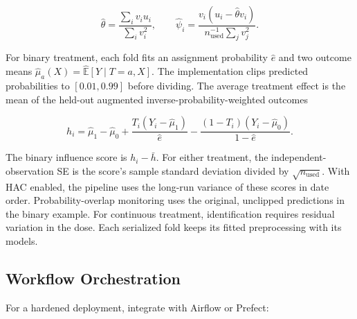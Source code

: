 \[
\hat\theta=\frac{\sum_i v_i u_i}{\sum_i v_i^2},
\qquad
\hat\psi_i=\frac{v_i(u_i-\hat\theta v_i)}{n_{\mathrm{used}}^{-1}\sum_j v_j^2}.
\]

For binary treatment, each fold fits an assignment probability $\hat e$ and two outcome means $\hat\mu_a(X)=\widehat{\mathbb{E}}[Y\mid T=a,X]$. The implementation clips predicted probabilities to $[0.01,0.99]$ before dividing. The average treatment effect is the mean of the held-out augmented inverse-probability-weighted outcomes

\[
h_i = \hat\mu_1-\hat\mu_0 + \frac{T_i(Y_i-\hat\mu_1)}{\hat e}
       -\frac{(1-T_i)(Y_i-\hat\mu_0)}{1-\hat e}.
\]

The binary influence score is $h_i-\bar h$. For either treatment, the independent-observation SE is the score's sample standard deviation divided by $\sqrt{n_{\mathrm{used}}}$. With HAC enabled, the pipeline uses the long-run variance of these scores in date order. Probability-overlap monitoring uses the original, unclipped predictions in the binary example. For continuous treatment, identification requires residual variation in the dose. Each serialized fold keeps its fitted preprocessing with its models.

\subsection{Workflow Orchestration}

For a hardened deployment, integrate with Airflow or Prefect:

